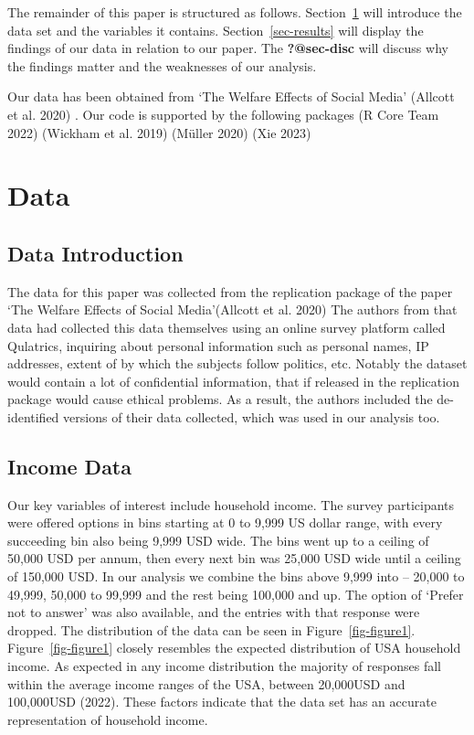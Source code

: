 \documentclass[
  letterpaper,
  DIV=11,
  numbers=noendperiod]{scrartcl}
\begin{document}
The remainder of this paper is structured as follows.
Section~\ref{sec-data} will introduce the data set and the variables it
contains. Section~\ref{sec-results} will display the findings of our
data in relation to our paper. The \textbf{?@sec-disc} will discuss why
the findings matter and the weaknesses of our analysis.

Our data has been obtained from `The Welfare Effects of Social Media'
(Allcott et al. 2020) . Our code is supported by the following packages
(R Core Team 2022) (Wickham et al. 2019) (Müller 2020) (Xie 2023)

\section{Data}\label{sec-data}

\subsection{Data Introduction}\label{sec-dataintro}

The data for this paper was collected from the replication package of
the paper `The Welfare Effects of Social Media'(Allcott et al. 2020) The
authors from that data had collected this data themselves using an
online survey platform called Qulatrics, inquiring about personal
information such as personal names, IP addresses, extent of by which the
subjects follow politics, etc. Notably the dataset would contain a lot
of confidential information, that if released in the replication package
would cause ethical problems. As a result, the authors included the
de-identified versions of their data collected, which was used in our
analysis too.

\subsection{Income Data}\label{sec-income_data}

Our key variables of interest include household income. The survey
participants were offered options in bins starting at 0 to 9,999 US
dollar range, with every succeeding bin also being 9,999 USD wide. The
bins went up to a ceiling of 50,000 USD per annum, then every next bin
was 25,000 USD wide until a ceiling of 150,000 USD. In our analysis we
combine the bins above 9,999 into -- 20,000 to 49,999, 50,000 to 99,999
and the rest being 100,000 and up. The option of `Prefer not to answer'
was also available, and the entries with that response were dropped. The
distribution of the data can be seen in Figure~\ref{fig-figure1}.
Figure~\ref{fig-figure1} closely resembles the expected distribution of
USA household income. As expected in any income distribution the
majority of responses fall within the average income ranges of the USA,
between 20,000USD and 100,000USD (2022). These factors indicate that the
data set has an accurate representation of household income.
\end{document}
